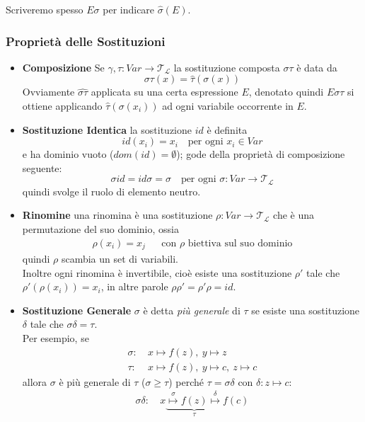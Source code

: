 Scriveremo spesso $E\sigma$ per indicare $\hat{\sigma}(E)$.

\subsubsection{Proprietà delle Sostituzioni}
\begin{itemize}
  \item{\textbf{Composizione}} Se $\gamma, \tau : Var \rightarrow \mathscr{T_L}$ la sostituzione composta $\sigma\tau$ è data da
    $$
    \sigma\tau(x) = \hat{\tau}(\sigma(x))
    $$
    Ovviamente $\hat{\sigma\tau}$ applicata su una certa espressione $E$, denotato quindi $E\sigma\tau$ si ottiene applicando $\hat{\tau}(\sigma(x_i))$ ad ogni variabile occorrente in $E$.
    \item{\textbf{Sostituzione Identica}} la sostituzione $id$ è definita 
    $$
    id(x_i) = x_i ~~~ \text{ per ogni } x_i \in Var
    $$
    e ha dominio vuoto ($dom(id) = \emptyset$); gode della proprietà di composizione seguente:
    $$
    \sigma id = id \sigma = \sigma ~~~ \text{ per ogni } \sigma:Var \rightarrow \mathscr{T_L}
    $$
    quindi svolge il ruolo di elemento neutro.
  \item{\textbf{Rinomine}} una rinomina è una sostituzione $\rho: Var \rightarrow \mathscr{T_L}$ che è una permutazione del suo dominio, ossia 
    \begin{align*}
    \rho(x_i) = x_j && \text{con $\rho$ biettiva sul suo dominio}
    \end{align*}
    quindi $\rho$ scambia un set di variabili. \\
    Inoltre ogni rinomina è invertibile, cioè esiste una sostituzione $\rho'$ tale che $\rho'(\rho(x_i)) = x_i$, in altre parole $\rho\rho' = \rho'\rho = id$.
  \item{\textbf{Sostituzione Generale}} $\sigma$ è detta \textit{più generale} di $\tau$ se esiste una sostituzione $\delta$ tale che $\sigma\delta = \tau$. \\ 
    Per esempio, se
    \begin{align*}
    \sigma: &\ x \mapsto f(z),\ y \mapsto z \\
    \tau : &\  x \mapsto f(z),\ y \mapsto c,\ z \mapsto c
    \end{align*}
    allora $\sigma$ è più generale di $\tau$ ($\sigma \geq \tau$) perché $\tau = \sigma\delta$ con $\delta: z \mapsto c$:
    \begin{align*}
    \sigma\delta: &\ x \underbrace{\stackrel \sigma \mapsto f(z) \stackrel \delta \mapsto}_{\tau} f(c) \\

\end{align*}
\end{itemize}
